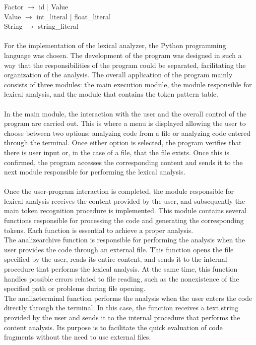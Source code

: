 \documentclass[letterpaper,12pt,oneside]{article}
\begin{document}
Factor $\rightarrow$ id | Value \\
Value $\rightarrow$ int\_literal | float\_literal \\
String $\rightarrow$ string\_literal
\\\\
For the implementation of the lexical analyzer, the Python programming language was chosen. The development of the program was designed in such a way that the responsibilities of the program could be separated, facilitating the organization of the analysis. The overall application of the program mainly consists of three modules: the main execution module, the module responsible for lexical analysis, and the module that contains the token pattern table. \\ \\
In the main module, the interaction with the user and the overall control of the program are carried out. This is where a menu is displayed allowing the user to choose between two options: analyzing code from a file or analyzing code entered through the terminal. Once either option is selected, the program verifies that there is user input or, in the case of a file, that the file exists. Once this is confirmed, the program accesses the corresponding content and sends it to the next module responsible for performing the lexical analysis. \\ \\
Once the user-program interaction is completed, the module responsible for lexical analysis receives the content provided by the user, and subsequently the main token recognition procedure is implemented. This module contains several functions responsible for processing the code and generating the corresponding tokens. Each function is essential to achieve a proper analysis. \\
The analizearchive function is responsible for performing the analysis when the user provides the code through an external file. This function opens the file specified by the user, reads its entire content, and sends it to the internal procedure that performs the lexical analysis. At the same time, this function handles possible errors related to file reading, such as the nonexistence of the specified path or problems during file opening. \\
The analizeterminal function performs the analysis when the user enters the code directly through the terminal. In this case, the function receives a text string provided by the user and sends it to the internal procedure that performs the content analysis. Its purpose is to facilitate the quick evaluation of code fragments without the need to use external files. \\
\end{document}
